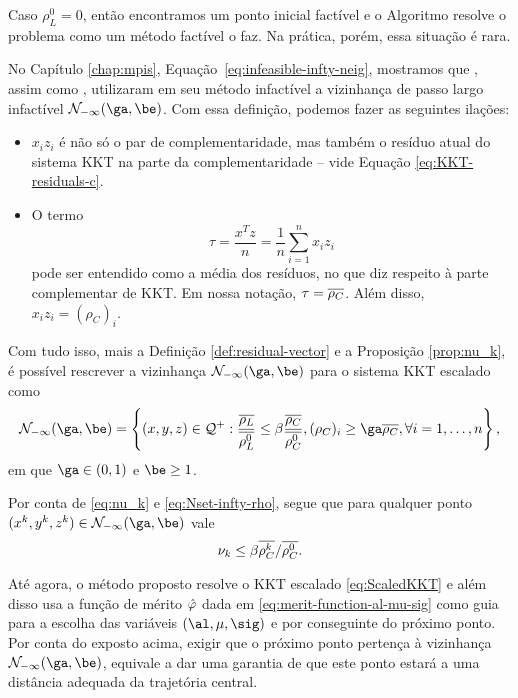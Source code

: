 Caso $\rho_L^0 = 0$, então encontramos um ponto inicial factível e o Algoritmo resolve o problema como um método factível o faz. Na prática, porém, essa situação é rara.


No Capítulo \ref{chap:mpis}, Equação~\eqref{eq:infeasible-infty-neig},
mostramos que \textcite{Kojima:1993fe}, assim como 
\textcite[pg.~110]{Wright:Primal-dual-interior-point:1997h}, utilizaram em seu
método infactível a vizinhança de passo largo infactível $\Nset_{-\infty}(\ga,\be)$. Com essa definição, podemos fazer as seguintes ilações:
\begin{itemize}
  \item $x_iz_i$  é não só o par de complementaridade, mas também o resíduo
  atual do sistema KKT na parte da complementaridade -- vide  Equação
  \eqref{eq:KKT-residuals-c}.
  \item O termo  \[\tau = \frac{x^Tz}{n} = \frac{1}{n}\sum_{i=1}^nx_iz_i\]
  pode ser entendido como a média dos resíduos, no que diz respeito à parte
  complementar de KKT. Em nossa notação, $\tau = \overline{\rho_{C}}$. Além disso, $x_iz_i = (\rho_{C})_i$.
\end{itemize}

Com tudo isso, mais a Definição \ref{def:residual-vector} e a Proposição \ref{prop:nu_k}, é possível rescrever  a vizinhança
 $\Nset_{-\infty}(\ga,\be)$ para  o sistema KKT escalado
como
\begin{equation}\label{eq:Nset-infty-rho}
\Nset_{-\infty}(\ga,\be) =
 \left\{(x,y,z) \in \Qset^+:\frac{\dbvec{\rho_L}}{\dbvec{\rho^0_L}}    \leq
\beta\frac{\dbvec{\rho_C}}{\dbvec{\rho_C^{0}}}, (\rho_{C})_i \geq
{\ga}\dbvec{\rho_{C}},\forall i =1,\ldots,n  \right\},
\end{equation}
em que $\ga\in(0,1)$ e $\be\geq1$. 

Por conta de \eqref{eq:nu_k} e \eqref{eq:Nset-infty-rho}, segue que para qualquer ponto $(\xk,\yk,\zk)\in \Nset_{-\infty}(\ga,\be) $ vale
\begin{equation}
	\label{eq:nu_k-rho0-rhok}
	 \nu_{k} \leq \beta\overline{\rho_C^{k}}/\overline{\rho_C^{0}}.
\end{equation}


Até agora, o método proposto resolve o \ac{KKT} escalado \eqref{eq:ScaledKKT}
e além disso usa a função de mérito $\hat{\varphi}$ dada em
\eqref{eq:merit-function-al-mu-sig} como guia para a escolha das variáveis
$(\al,\mu,\sig)$  e por conseguinte do próximo ponto. Por conta do exposto
acima, exigir que o próximo ponto pertença à vizinhança $\Nset_{-\infty}(\ga,\be)$, equivale a dar 
uma garantia de que este ponto estará a uma  distância adequada da
trajetória central.

